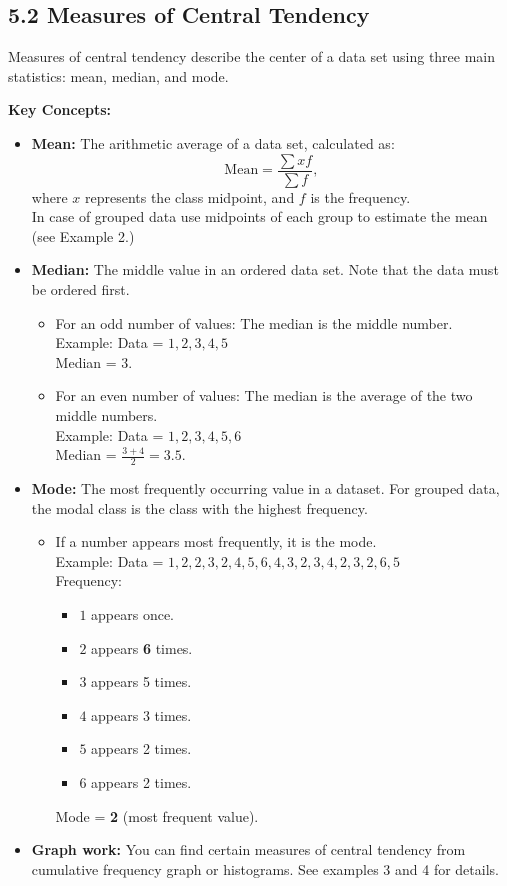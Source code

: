 
\subsection*{5.2 Measures of Central Tendency}
Measures of central tendency describe the center of a data set using three main statistics: mean, median, and mode.

\textbf{Key Concepts:}

\begin{itemize}
	\item \textbf{Mean:} The arithmetic average of a data set, calculated as:
	\[
	\text{Mean} = \frac{\sum x f}{\sum f},
	\]
	where $x$ represents the class midpoint, and $f$ is the frequency.\\
	In case of grouped data use midpoints of each group to estimate the mean (see Example 2.)
	
	\item \textbf{Median:} The middle value in an ordered data set. Note that the data must be ordered first. \\
	\begin{itemize}
		\item For an odd number of values: The median is the middle number. \\
		Example: Data = $1,2,3,4,5$ \\ Median = $3$.
		\item For an even number of values: The median is the average of the two middle numbers. \\
		Example: Data = $1,2,3,4,5,6$ \\ Median = $\frac{3+4}{2} = 3.5$.
	\end{itemize}
	
	\item \textbf{Mode:} The most frequently occurring value in a dataset. For grouped data, the modal class is the class with the highest frequency. 
	
	\begin{itemize}
		\item If a number appears most frequently, it is the mode. \\
		Example: Data = $1,2,2,3,2,4,5,6,4,3,2,3,4,2,3,2,6,5$ \\
		Frequency: 
		\begin{itemize}
			\item $1$ appears once.
			\item $2$ appears \textbf{6} times.
			\item $3$ appears 5 times.
			\item $4$ appears 3 times.
			\item $5$ appears 2 times.
			\item $6$ appears 2 times.
		\end{itemize}
		Mode = \textbf{2} (most frequent value).
	\end{itemize}
	
	\item \textbf{Graph work:} You can find certain measures of central tendency from cumulative frequency graph or histograms. See examples 3 and 4 for details.
\end{itemize}

